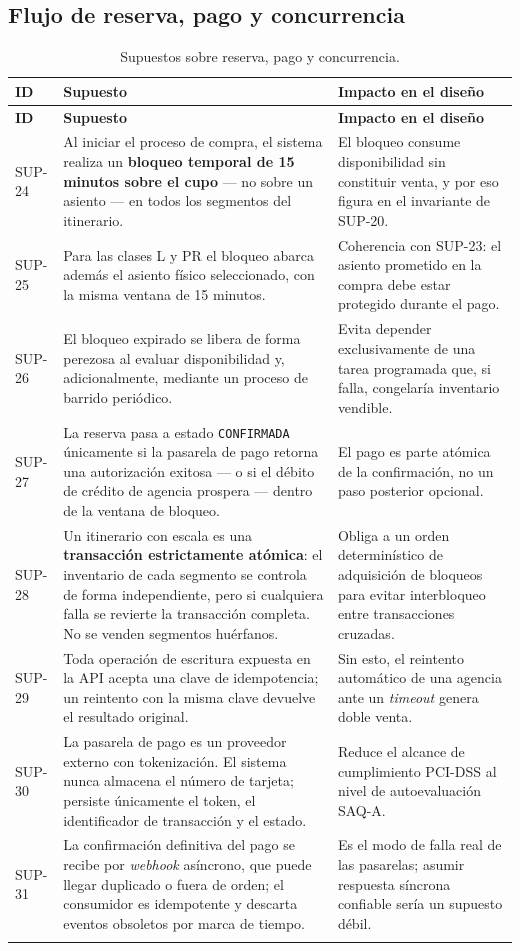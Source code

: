 \documentclass[10pt,letterpaper]{article}
\begin{document}
\subsection{Flujo de reserva, pago y concurrencia}
\begin{longtable}{@{}L{1.7cm} L{7.4cm} L{6.1cm}@{}}
\toprule
\textbf{ID} & \textbf{Supuesto} & \textbf{Impacto en el diseño} \\
\midrule
\endfirsthead
\toprule
\textbf{ID} & \textbf{Supuesto} & \textbf{Impacto en el diseño} \\
\midrule
\endhead
SUP-24 & Al iniciar el proceso de compra, el sistema realiza un \textbf{bloqueo temporal de 15 minutos sobre el cupo} --- no sobre un asiento --- en todos los segmentos del itinerario. & El bloqueo consume disponibilidad sin constituir venta, y por eso figura en el invariante de SUP-20. \\
SUP-25 & Para las clases L y PR el bloqueo abarca además el asiento físico seleccionado, con la misma ventana de 15 minutos. & Coherencia con SUP-23: el asiento prometido en la compra debe estar protegido durante el pago. \\
SUP-26 & El bloqueo expirado se libera de forma perezosa al evaluar disponibilidad y, adicionalmente, mediante un proceso de barrido periódico. & Evita depender exclusivamente de una tarea programada que, si falla, congelaría inventario vendible. \\
SUP-27 & La reserva pasa a estado \texttt{CONFIRMADA} únicamente si la pasarela de pago retorna una autorización exitosa --- o si el débito de crédito de agencia prospera --- dentro de la ventana de bloqueo. & El pago es parte atómica de la confirmación, no un paso posterior opcional. \\
SUP-28 & Un itinerario con escala es una \textbf{transacción estrictamente atómica}: el inventario de cada segmento se controla de forma independiente, pero si cualquiera falla se revierte la transacción completa. No se venden segmentos huérfanos. & Obliga a un orden determinístico de adquisición de bloqueos para evitar interbloqueo entre transacciones cruzadas. \\
SUP-29 & Toda operación de escritura expuesta en la API acepta una clave de idempotencia; un reintento con la misma clave devuelve el resultado original. & Sin esto, el reintento automático de una agencia ante un \emph{timeout} genera doble venta. \\
SUP-30 & La pasarela de pago es un proveedor externo con tokenización. El sistema nunca almacena el número de tarjeta; persiste únicamente el token, el identificador de transacción y el estado. & Reduce el alcance de cumplimiento PCI-DSS al nivel de autoevaluación SAQ-A. \\
SUP-31 & La confirmación definitiva del pago se recibe por \emph{webhook} asíncrono, que puede llegar duplicado o fuera de orden; el consumidor es idempotente y descarta eventos obsoletos por marca de tiempo. & Es el modo de falla real de las pasarelas; asumir respuesta síncrona confiable sería un supuesto débil. \\
\bottomrule
\caption{Supuestos sobre reserva, pago y concurrencia.}
\end{longtable}
\end{document}
